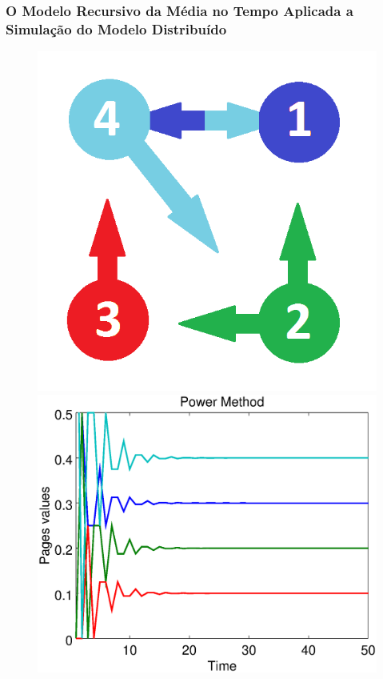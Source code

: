 \documentclass{beamer}
\begin{document}
\begin{frame}
	\frametitle{O Modelo Recursivo da Média no Tempo Aplicada a Simulação do Modelo Distribuído}
	
	\vspace{-0.5cm}
\begin{figure}[!htb]
	\centering
	\includegraphics[scale=0.2]{figures/grafo}\\
	\includegraphics[scale=0.25]{figures/50/powermetod.eps}

\end{figure}
\end{frame}
\end{document}
